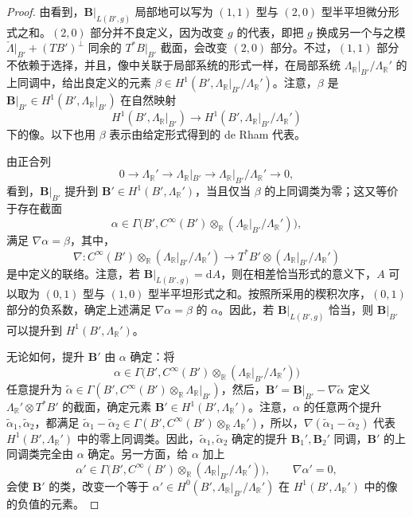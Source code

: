 \begin{proof}
由看到，$\mathbf B|_{L(B',g)}$ 局部地可以写为 $(1,1)$ 型与 $(2,0)$ 型半平坦微分形式之和。$(2,0)$ 部分并不良定义，因为改变 $g$ 的代表，即把 $g$ 换成另一个与之模 $\check\Lambda|_{B'}+(TB')^\perp$ 同余的 $T^*B|_{B'}$ 截面，会改变 $(2,0)$ 部分。不过，$(1,1)$ 部分不依赖于选择，并且，像中关联于局部系统的形式一样，在局部系统 $\Lambda_{\mathbb R}|_{B'}/\Lambda_{\mathbb R}'$ 的上同调中，给出良定义的元素 $\beta\in H^1(B',\Lambda_{\mathbb R}|_{B'}/\Lambda_{\mathbb R}')$。注意，$\beta$ 是 $\mathbf B|_{B'}\in H^1(B',\Lambda_{\mathbb R}|_{B'})$ 在自然映射
\[
H^1(B',\Lambda_{\mathbb R}|_{B'})
\longrightarrow H^1(B',\Lambda_{\mathbb R}|_{B'}/\Lambda_{\mathbb R}')
\]
下的像。以下也用 $\beta$ 表示由给定形式得到的 de Rham 代表。

由正合列
\[
0\longrightarrow\Lambda_{\mathbb R}'\longrightarrow\Lambda_{\mathbb R}|_{B'}
\longrightarrow\Lambda_{\mathbb R}|_{B'}/\Lambda_{\mathbb R}'\longrightarrow0,
\]
看到，$\mathbf B|_{B'}$ 提升到 $\mathbf B'\in H^1(B',\Lambda_{\mathbb R}')$，当且仅当 $\beta$ 的上同调类为零；这又等价于存在截面
\[
\alpha\in\Gamma\bigl(B',C^\infty(B')\otimes_{\mathbb R}
(\Lambda_{\mathbb R}|_{B'}/\Lambda_{\mathbb R}')\bigr),
\]
满足 $\nabla\alpha=\beta$，其中，
\[
\nabla\colon C^\infty(B')\otimes_{\mathbb R}
(\Lambda_{\mathbb R}|_{B'}/\Lambda_{\mathbb R}')
\longrightarrow T^*B'\otimes
(\Lambda_{\mathbb R}|_{B'}/\Lambda_{\mathbb R}')
\]
是中定义的联络。注意，若 $\mathbf B|_{L(B',g)}=\mathrm dA$，则在相差恰当形式的意义下，$A$ 可以取为 $(0,1)$ 型与 $(1,0)$ 型半平坦形式之和。按照所采用的楔积次序，$(0,1)$ 部分的负系数，确定上述满足 $\nabla\alpha=\beta$ 的 $\alpha$。因此，若 $\mathbf B|_{L(B',g)}$ 恰当，则 $\mathbf B|_{B'}$ 可以提升到 $H^1(B',\Lambda_{\mathbb R}')$。

无论如何，提升 $\mathbf B'$ 由 $\alpha$ 确定：将
\[
\alpha\in\Gamma\bigl(B',C^\infty(B')\otimes_{\mathbb R}
(\Lambda_{\mathbb R}|_{B'}/\Lambda_{\mathbb R}')\bigr)
\]
任意提升为 $\widetilde\alpha\in\Gamma(B',C^\infty(B')\otimes_{\mathbb R}\Lambda_{\mathbb R}|_{B'})$，然后，$\mathbf B'=\mathbf B|_{B'}-\nabla\widetilde\alpha$ 定义 $\Lambda_{\mathbb R}'\otimes T^*B'$ 的截面，确定元素 $\mathbf B'\in H^1(B',\Lambda_{\mathbb R}')$。注意，$\alpha$ 的任意两个提升 $\widetilde\alpha_1,\widetilde\alpha_2$，都满足 $\widetilde\alpha_1-\widetilde\alpha_2\in\Gamma(B',C^\infty(B')\otimes_{\mathbb R}\Lambda_{\mathbb R}')$，所以，$\nabla(\widetilde\alpha_1-\widetilde\alpha_2)$ 代表 $H^1(B',\Lambda_{\mathbb R}')$ 中的零上同调类。因此，$\widetilde\alpha_1,\widetilde\alpha_2$ 确定的提升 $\mathbf B_1',\mathbf B_2'$ 同调，$\mathbf B'$ 的上同调类完全由 $\alpha$ 确定。另一方面，给 $\alpha$ 加上
\[
\alpha'\in\Gamma\bigl(B',C^\infty(B')\otimes_{\mathbb R}
(\Lambda_{\mathbb R}|_{B'}/\Lambda_{\mathbb R}')\bigr),
\qquad\nabla\alpha'=0,
\]
会使 $\mathbf B'$ 的类，改变一个等于 $\alpha'\in H^0(B',\Lambda_{\mathbb R}|_{B'}/\Lambda_{\mathbb R}')$ 在 $H^1(B',\Lambda_{\mathbb R}')$ 中的像的负值的元素。


\end{proof}
